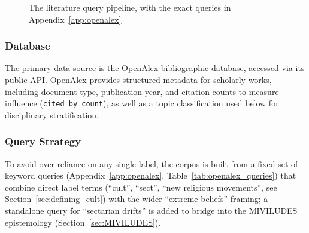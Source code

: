 \begin{figure}[htbp]
    \centering
    \scriptsize
    \caption{The literature query pipeline, with the exact queries in Appendix~\ref{app:openalex}}
    \label{fig:literature_pipeline}
\end{figure}

\subsubsection{Database}

The primary data source is the OpenAlex \autocite{priemOpenAlexFullyopenIndex2022} bibliographic database, accessed via its public API. OpenAlex provides structured metadata for scholarly works, including document type, publication year, and citation counts to measure influence (\verb+cited_by_count+), as well as a topic classification used below for disciplinary stratification.

\subsubsection{Query Strategy}
To avoid over-reliance on any single label, the corpus is built from a fixed set of keyword queries (Appendix~\ref{app:openalex}, Table~\ref{tab:openalex_queries}) that combine direct label terms (\enquote{cult}, \enquote{sect}, \enquote{new religious movements}, see Section~\ref{sec:defining_cult}) with the wider \enquote{extreme beliefs} framing; a standalone query for \enquote{sectarian drifts} is added to bridge into the MIVILUDES epistemology (Section~\ref{sec:MIVILUDES}).

